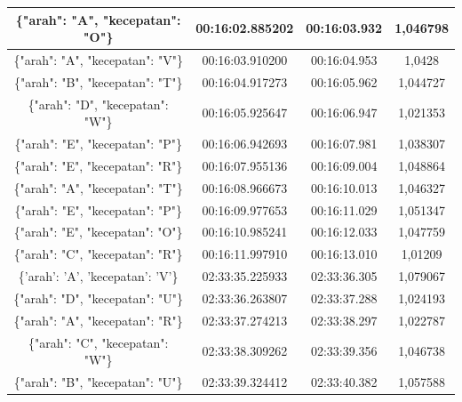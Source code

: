 \begin{longtable}{|ccc|c|}
  \multicolumn{1}{|c|}{\{"arah": "A", "kecepatan": "O"\}} & \multicolumn{1}{c|}{00:16:02.885202} & 00:16:03.932       & 1,046798    \\ \hline
  \multicolumn{1}{|c|}{\{"arah": "A", "kecepatan": "V"\}} & \multicolumn{1}{c|}{00:16:03.910200} & 00:16:04.953       & 1,0428      \\ \hline
  \multicolumn{1}{|c|}{\{"arah": "B", "kecepatan": "T"\}} & \multicolumn{1}{c|}{00:16:04.917273} & 00:16:05.962       & 1,044727    \\ \hline
  \multicolumn{1}{|c|}{\{"arah": "D", "kecepatan": "W"\}} & \multicolumn{1}{c|}{00:16:05.925647} & 00:16:06.947       & 1,021353    \\ \hline
  \multicolumn{1}{|c|}{\{"arah": "E", "kecepatan": "P"\}} & \multicolumn{1}{c|}{00:16:06.942693} & 00:16:07.981       & 1,038307    \\ \hline
  \multicolumn{1}{|c|}{\{"arah": "E", "kecepatan": "R"\}} & \multicolumn{1}{c|}{00:16:07.955136} & 00:16:09.004       & 1,048864    \\ \hline
  \multicolumn{1}{|c|}{\{"arah": "A", "kecepatan": "T"\}} & \multicolumn{1}{c|}{00:16:08.966673} & 00:16:10.013       & 1,046327    \\ \hline
  \multicolumn{1}{|c|}{\{"arah": "E", "kecepatan": "P"\}} & \multicolumn{1}{c|}{00:16:09.977653} & 00:16:11.029       & 1,051347    \\ \hline
  \multicolumn{1}{|c|}{\{"arah": "E", "kecepatan": "O"\}} & \multicolumn{1}{c|}{00:16:10.985241} & 00:16:12.033       & 1,047759    \\ \hline
  \multicolumn{1}{|c|}{\{"arah": "C", "kecepatan": "R"\}} & \multicolumn{1}{c|}{00:16:11.997910} & 00:16:13.010       & 1,01209     \\ \hline
  \multicolumn{1}{|c|}{\{'arah': 'A', 'kecepatan': 'V'\}} & \multicolumn{1}{c|}{02:33:35.225933} & 02:33:36.305       & 1,079067    \\ \hline
  \multicolumn{1}{|c|}{\{"arah": "D", "kecepatan": "U"\}} & \multicolumn{1}{c|}{02:33:36.263807} & 02:33:37.288       & 1,024193    \\ \hline
  \multicolumn{1}{|c|}{\{"arah": "A", "kecepatan": "R"\}} & \multicolumn{1}{c|}{02:33:37.274213} & 02:33:38.297       & 1,022787    \\ \hline
  \multicolumn{1}{|c|}{\{"arah": "C", "kecepatan": "W"\}} & \multicolumn{1}{c|}{02:33:38.309262} & 02:33:39.356       & 1,046738    \\ \hline
  \multicolumn{1}{|c|}{\{"arah": "B", "kecepatan": "U"\}} & \multicolumn{1}{c|}{02:33:39.324412} & 02:33:40.382       & 1,057588    \\ \hline

\end{longtable}
